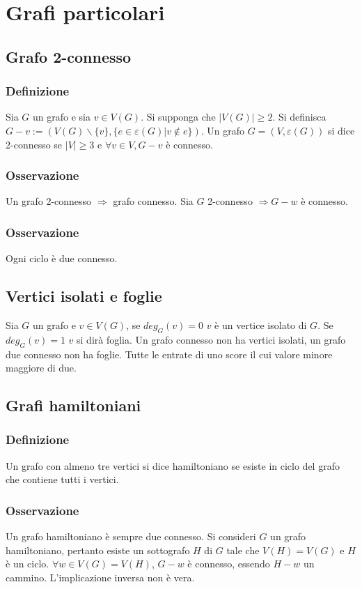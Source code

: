 \section{Grafi particolari}
\subsection{Grafo 2-connesso}
\subsubsection{Definizione}
Sia $G$ un grafo e sia $v\in V(G)$. Si supponga che $|V(G)|\ge 2$. Si definisca $G-v:=(V(G)\backslash \{v\}, \{e\in\varepsilon(G)|v\not\in e\})$. Un grafo $G=(V,\varepsilon(G
))$ si dice 2-connesso se $|V|\ge 3$ e $\forall v \in V, G-v$ \`e connesso. 
\subsubsection{Osservazione}
Un grafo 2-connesso $\Rightarrow$ grafo connesso. Sia $G$ 2-connesso $\Rightarrow G-w$ \`e connesso.
\subsubsection{Osservazione}
Ogni ciclo \`e due connesso.
\subsection{Vertici isolati e foglie}
Sia $G$ un grafo e $v\in V(G)$, se $deg_G(v)=0$ $v$ \`e un vertice isolato di $G$. Se $deg_G(v)=1$ $v$ si dir\`a foglia. Un grafo connesso non ha vertici isolati, un grafo 
due connesso non ha foglie. Tutte le entrate di uno score il cui valore minore maggiore di due.
\subsection{Grafi hamiltoniani}
\subsubsection{Definizione}
Un grafo con almeno tre vertici si dice hamiltoniano se esiste in ciclo del grafo che contiene tutti i vertici. 
\subsubsection{Osservazione}
Un grafo hamiltoniano \`e sempre due connesso. Si consideri $G$ un grafo hamiltoniano, pertanto esiste un sottografo $H$ di $G$ tale che $V(H)=V(G)$ e $H$ \`e un ciclo. $
\forall w\in V(G)=V(H)$, $G-w$ \`e connesso, essendo $H-w$ un cammino. L'implicazione inversa non \`e vera.